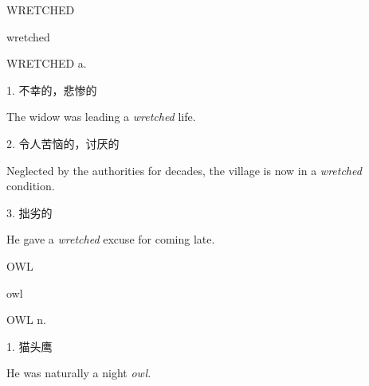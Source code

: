 \begin{flashcard}{
WRETCHED

wretched
}
\begin{center}
WRETCHED a. 
\end{center}
1. 不幸的，悲惨的

The widow was leading a \textit{wretched} life.

2. 令人苦恼的，讨厌的

Neglected by the authorities for decades, the village is now in a \textit{wretched} condition.

3. 拙劣的

He gave a \textit{wretched} excuse for coming late.

\end{flashcard}
\begin{flashcard}{
OWL

owl
}
\begin{center}
OWL n. \textipa{[aul]}
\end{center}
1. 猫头鹰

He was naturally a night \textit{owl}.

\end{flashcard}
